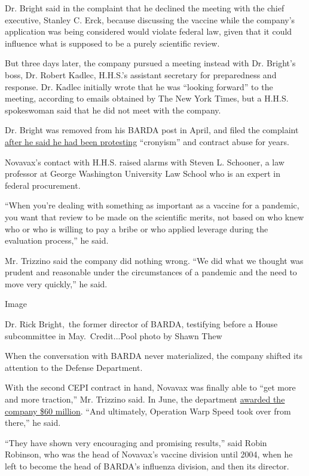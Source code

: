 Dr. Bright said in the complaint that he declined the meeting with the
chief executive, Stanley C. Erck, because discussing the vaccine while
the company's application was being considered would violate federal
law, given that it could influence what is supposed to be a purely
scientific review.

But three days later, the company pursued a meeting instead with Dr.
Bright's boss, Dr. Robert Kadlec, H.H.S.'s assistant secretary for
preparedness and response. Dr. Kadlec initially wrote that he was
``looking forward'' to the meeting, according to emails obtained by The
New York Times, but a H.H.S. spokeswoman said that he did not meet with
the company.

Dr. Bright was removed from his BARDA post in April, and filed the
complaint
\href{https://www.nytimes.com/2020/05/09/us/politics/whistle-blower-trump-coronavirus.html}{after
he said he had been protesting} ``cronyism'' and contract abuse for
years.

Novavax's contact with H.H.S. raised alarms with Steven L. Schooner, a
law professor at George Washington University Law School who is an
expert in federal procurement.

``When you're dealing with something as important as a vaccine for a
pandemic, you want that review to be made on the scientific merits, not
based on who knew who or who is willing to pay a bribe or who applied
leverage during the evaluation process,'' he said.

Mr. Trizzino said the company did nothing wrong. ``We did what we
thought was prudent and reasonable under the circumstances of a pandemic
and the need to move very quickly,'' he said.

Image

Dr. Rick Bright,~the former director of BARDA, testifying before a House
subcommittee in May.~Credit...Pool photo by Shawn Thew

When the conversation with BARDA never materialized, the company shifted
its attention to the Defense Department.

With the second CEPI contract in hand, Novavax was finally able to ``get
more and more traction,'' Mr. Trizzino said. In June, the department
\href{https://ir.novavax.com/news-releases/news-release-details/novavax-awarded-department-defense-contract-covid-19-vaccine}{awarded
the company \$60 million}. ``And ultimately, Operation Warp Speed took
over from there,'' he said.

``They have shown very encouraging and promising results,'' said Robin
Robinson, who was the head of Novavax's vaccine division until 2004,
when he left to become the head of BARDA's influenza division, and then
its director.

